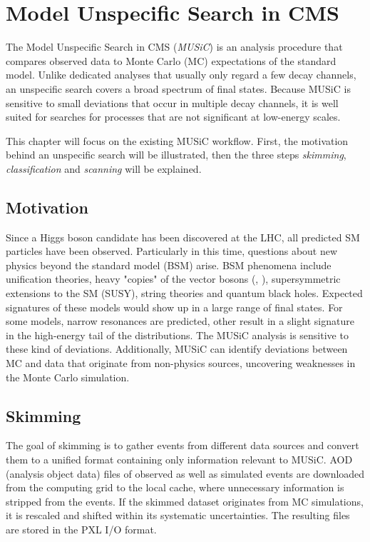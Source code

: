 \chapter{Model Unspecific Search in CMS}

The Model Unspecific Search in CMS (\emph{MUSiC}) is an analysis procedure that compares observed data to Monte Carlo (MC) expectations of the standard model. Unlike dedicated analyses that usually only regard a few decay channels, an unspecific search covers a broad spectrum of final states. Because MUSiC is sensitive to small deviations that occur in multiple decay channels, it is well suited for searches for processes that are not significant at low-energy scales.

This chapter will focus on the existing MUSiC workflow. First, the motivation behind an unspecific search will be illustrated, then the three steps \emph{skimming}, \emph{classification} and \emph{scanning} will be explained\cite{Pieta2012MUSiC,Papacz2014Model}.

\section{Motivation}
Since a Higgs boson candidate has been discovered at the LHC\cite{Ao2015Combined}, all predicted SM particles have been observed. Particularly in this time, questions about new physics beyond the standard model (BSM) arise. 
BSM phenomena include unification theories, heavy "copies" of the vector bosons (\PZprime, \PWprime), supersymmetric extensions to the SM (SUSY), string theories and quantum black holes.
Expected signatures of these models would show up in a large range of final states. For some models, narrow resonances are predicted, other result in a slight signature in the high-energy tail of the distributions.
The MUSiC analysis is sensitive to these kind of deviations.
Additionally, MUSiC can identify deviations between MC and data that originate from non-physics sources, uncovering weaknesses in the Monte Carlo simulation.

\section{Skimming}
The goal of skimming is to gather events from different data sources and convert them to a unified format containing only information relevant to MUSiC. AOD (analysis object data) files of observed as well as simulated events are downloaded from the computing grid to the local cache, where unnecessary information is stripped from the events. If the skimmed dataset originates from MC simulations, it is rescaled and shifted within its systematic uncertainties.
The resulting files are stored in the PXL I/O format\cite{BBE+2012Development}.

